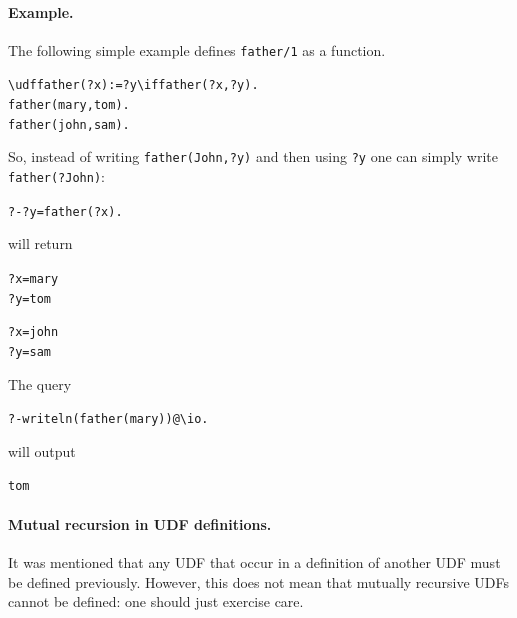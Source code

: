 \documentclass[11pt]{article}
\newcommand{\bs}{\textbackslash}
\begin{document}
\paragraph{Example.}
The following simple example defines \texttt{father/1} as a function.
\begin{alltt}
    \bs{}udf father(?x):=?y \bs{}if father(?x,?y).
    father(mary,tom).
    father(john,sam).
\end{alltt}

So, instead of writing \texttt{father(John,?y)}  and then using \texttt{?y}
one can simply write \texttt{father(?John)}:  
\begin{alltt}
    ?- ?y=father(?x).
\end{alltt}
will return
\begin{alltt}
    ?x=mary
    ?y=tom

    ?x=john
    ?y=sam
\end{alltt}
The query
\begin{alltt}
    ?- writeln(father(mary))@\bs{}io.
\end{alltt}
will output
\begin{alltt}
    tom
\end{alltt}

\paragraph{Mutual recursion in UDF definitions.}
It was mentioned that any UDF that occur in a definition of another UDF
must be defined previously. However, this does not mean that mutually
recursive UDFs cannot be defined: one should just exercise care.
\end{document}
